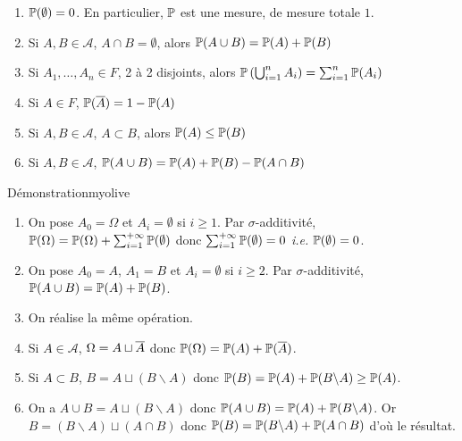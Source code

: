     \begin{prop}{}{}
        \begin{enumerate}
            \item $\P(\emptyset) = 0$. En particulier, $\P$ est une mesure, de mesure totale $1$.
            \item Si $A,B \in \mathcal{A}$, $A \cap B = \emptyset$, alors $\P(A \cup B) = \P(A) + \P(B)$
            \item Si $A_1, \ldots, A_n \in F$, 2 à 2 disjoints, alors $\P\left(\bigcup_{i=1}^n A_i\right) = \sum_{i =1}^n \P(A_i)$
            \item Si $A \in F$, $\P(\ovl{A}) = 1 - \P(A)$
            \item Si $A, B \in \mathcal{A}$, $A \subset B$, alors $\P(A) \leq \P(B)$
            \item Si $A, B \in \mathcal{A}$, $\P(A \cup B) = \P(A) + \P(B) - \P(A \cap B)$
        \end{enumerate}
    \end{prop}

    \begin{demo}{Démonstration}{myolive}
        \begin{enumerate}
            \item On pose $A_0 = \Omega$ et $A_i = \emptyset$ si $i \geq 1$. Par $\sigma$-additivité, $\P(\Omega) = \P(\Omega) + \sum_{i=1}^{+\infty} \P(\emptyset)$ donc $\sum_{i=1}^{+\infty} \P(\emptyset) = 0$ \textit{i.e.} $\P(\emptyset) = 0$.
            \item On pose $A_0 = A$, $A_1 = B$ et $A_i = \emptyset$ si $i \geq 2$. Par $\sigma$-additivité, $\P(A \cup B) = \P(A) + \P(B)$.
            \item On réalise la même opération.
            \item Si $A \in \mathcal{A}$, $\Omega = A \sqcup \ovl{A}$ donc $\P(\Omega) = \P(A) + \P(\ovl{A})$.
            \item Si $A \subset B$, $B = A \sqcup (B \backslash A)$ donc $\P(B) = \P(A) + \P(B \backslash A) \geq \P(A)$.
            \item On a $A \cup B = A \sqcup (B \backslash A)$ donc $\P(A \cup B) = \P(A) + \P(B \backslash A)$. Or $B = (B \backslash A) \sqcup (A \cap B)$ donc $\P(B) = \P(B \backslash A) + \P(A \cap B)$ d’où le résultat.
        \end{enumerate}
    \end{demo}

